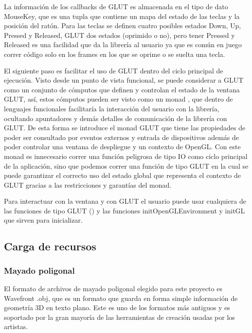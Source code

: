 La información de los callbacks de GLUT es almacenada en el tipo de dato MouseKey, que es una tupla que contiene un mapa del estado de las teclas y la posición del ratón.  Para las teclas se definen cuatro posibles estados Down, Up, Pressed y Released, GLUT dos estados (oprimido o no), pero tener Pressed y Released es una facilidad que da la librería al usuario ya que es común en juego correr código solo en los frames en los que se oprime o se suelta una tecla.

El siguiente paso es facilitar el uso de GLUT dentro del ciclo principal de ejecución. Visto desde un punto de vista funcional, se puede considerar a GLUT como  un conjunto de cómputos que definen y controlan el estado de la ventana GLUT, así, estos cómputos pueden ser visto como un monad \cite{moggi1991notions} \cite{wiki:MonadsComputation} \cite{wiki:MonadsContainers}, que dentro de lenguajes funcionales facilitaría la interacción del usuario con la librería, ocultando apuntadores y demás detalles de comunicación de la librería con GLUT. De esta forma se introduce el monad GLUT que tiene las propiedades de poder ser consultado por eventos externos y entrada de dispositivos además de poder controlar una ventana de despliegue y un contexto de OpenGL. Con este monad es innecesario correr una función peligrosa de tipo IO como ciclo principal de la aplicación, sino que podemos correr una función de tipo GLUT en la cual se puede garantizar el correcto uso del estado global que representa el contexto de GLUT gracias a las restricciones y garantías del monad.

Para interactuar con la ventana y con GLUT el usuario puede usar cualquiera de las funciones de tipo GLUT () y las funciones initOpenGLEnvironment y initGL que sirven para inicializar.

\subsection{Carga de recursos}

\subsubsection{Mayado poligonal}

El formato de archivos de mayado poligonal elegido para este proyecto es Wavefront .obj, que es un formato que guarda en forma simple información de geometría 3D en texto plano. Este es uno de los formatos más antiguos y es soportado por la gran mayoría de las herramientas de creación usadas por los artistas.

